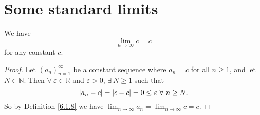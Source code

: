 \section{Some standard limits}\label{sec 6.5}

\begin{additional corollary}\label{ac 6.5.1}
We have
\[
    \lim_{n \to \infty} c = c
\]
for any constant \(c\).
\end{additional corollary}

\begin{proof}
Let \((a_n)_{n = 1}^\infty\) be a constant sequence where \(a_n = c\) for all \(n \geq 1\), and let \(N \in \mathds{N}\).
Then \(\forall\ \varepsilon \in \mathds{R}\) and \(\varepsilon > 0\), \(\exists\ N \geq 1\) such that
\[
    \abs*{a_n - c} = \abs*{c - c} = 0 \leq \varepsilon \ \forall \ n \geq N.
\]
So by Definition \ref{6.1.8} we have \(\lim_{n \to \infty} a_n = \lim_{n \to \infty} c = c\).
\end{proof}